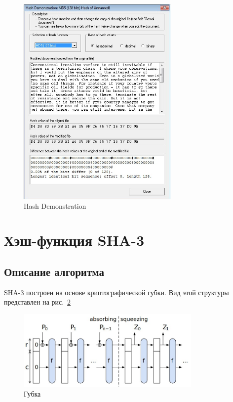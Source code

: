 \documentclass[a4paper, 14pt]{extarticle}
\begin{document}
\begin{enumerate}
        \begin{figure}[h]
            \centering
            \includegraphics[width=0.7\textwidth]{img/S005.jpg}
            \caption{Hash Demonstration}%
            \label{img:}
        \end{figure}
\end{enumerate}

\section{Хэш-функция SHA-3}
\subsection{Описание алгоритма}
SHA-3 построен на основе криптографической губки. Вид этой структуры представлен на рис.~\ref{img:sponge}

\begin{figure}[h]
    \centering
    \includegraphics[width=0.8\textwidth]{img/S003.jpg}
    \caption{Губка}%
    \label{img:sponge}
\end{figure}
\end{document}
